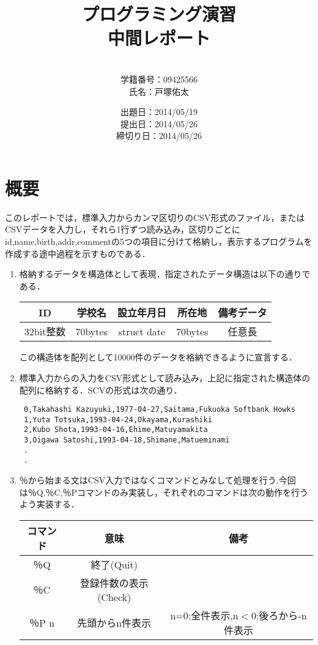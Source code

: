 \documentclass[a4j]{jarticle}
\title{プログラミング演習\\中間レポート}
\author{\\学籍番号：09425566\\氏名：戸塚佑太}
\date{出題日：2014/05/19\\提出日：2014/05/26\\締切り日：2014/05/26\\}
\begin{document}
\maketitle

\newpage



%
%

\section{概要}

このレポートでは，標準入力からカンマ区切りのCSV形式のファイル，またはCSVデータを入力し，それら1行ずつ読み込み，区切りごとにid,name,birth,addr,commentの5つの項目に分けて格納し，表示するプログラムを作成する途中過程を示すものである．

\begin{enumerate}
\item 格納するデータを構造体として表現．指定されたデータ構造は以下の通りである．

\begin{center}
\begin{tabular}{|c|c|c|c|c|}\hline
\centering
ID&学校名&設立年月日&所在地&備考データ\\\hline
32bit整数&70bytes&struct date&70bytes&任意長\\\hline
\end{tabular}
\end{center}

この構造体を配列として10000件のデータを格納できるように宣言する．

\item 標準入力からの入力をCSV形式として読み込み，上記に指定された構造体の配列に格納する．SCVの形式は次の通り．

{\baselineskip 3mm
\begin{verbatim}
 0,Takahashi Kazuyuki,1977-04-27,Saitama,Fukuoka Softbank Howks
 1,Yuta Totsuka,1993-04-24,Okayama,Kurashiki
 2,Kubo Shota,1993-04-16,Ehime,Matuyamakita
 3,Oigawa Satoshi,1993-04-18,Shimane,Matueminami
 .
 .
\end{verbatim}
}

\item ％から始まる文はCSV入力ではなくコマンドとみなして処理を行う.今回は％Q,％C,％Pコマンドのみ実装し，それぞれのコマンドは次の動作を行うよう実装する．

\begin{center}
\begin{tabular}{|c|c|c|}\hline
コマンド&意味&備考\\ \hline
％Q&終了(Quit)&\\ \hline
％C&登録件数の表示(Check)&\\ \hline
％P n&先頭からn件表示&n=0:全件表示,n$<$0:後ろから-n件表示\\ \hline
\end{tabular}
\end{center}

\end{enumerate}
\end{document}
